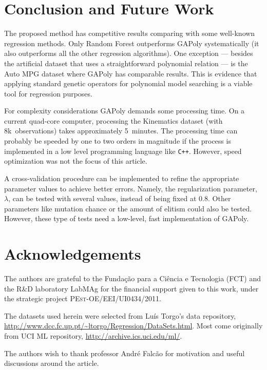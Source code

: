 \documentclass[final,authoryear,3p,times,twocolumn]{elsarticle}
\begin{document}
\section{Conclusion and Future Work}

The proposed method has competitive results comparing with some well-known regression methods. Only Random Forest outperforms \ac{GAPoly} systematically (it also outperforms all the other regression algorithms). One exception --- besides the artificial dataset that uses a straightforward polynomial relation --- is the Auto MPG dataset where \ac{GAPoly} has comparable results. This is evidence that applying standard genetic operators for polynomial model searching is a viable tool for regression purposes.

For complexity considerations \ac{GAPoly} demands some processing time. On a current quad-core computer, processing the Kinematics dataset (with 8k~observations) takes approximately 5~minutes. The processing time can probably be speeded by one to two orders in magnitude if the process is implemented in a low level programming language like \texttt{C++}. However, speed optimization was not the focus of this article.

A cross-validation procedure can be implemented to refine the appropriate parameter values to achieve better errors. Namely, the regularization parameter, $\lambda$, can be tested with several values, instead of being fixed at $0.8$. Other parameters like mutation chance or the amount of elitism could also be tested. However, these type of tests need a low-level, fast implementation of \ac{GAPoly}.

\section*{Acknowledgements}

The authors are grateful to the Fundação para a Ciência e Tecnologia (FCT) and the  R\&D laboratory LabMAg for the financial support given to this work, under the strategic project \textsc{PEst-OE/EEI/UI0434/2011}.

The datasets used herein were selected from Luís Torgo's data  repository, \url{http://www.dcc.fc.up.pt/~ltorgo/Regression/DataSets.html}. Most come originally from UCI ML repository, \url{http://archive.ics.uci.edu/ml/}.

The authors wish to thank professor André Falcão for motivation and useful discussions around the article.




    
\end{document}
